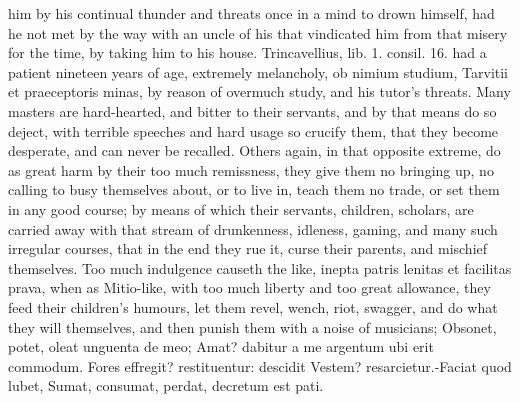{him by his continual thunder and threats once in a mind to drown
himself, had he not met by the way with an uncle of his that vindicated
him from that misery for the time, by taking him to his house.
Trincavellius, lib. 1. consil. 16. had a patient nineteen years of age,
extremely melancholy, ob nimium studium, Tarvitii et praeceptoris
minas, by reason of overmuch study, and his tutor's threats. Many
masters are hard-hearted, and bitter to their servants, and by that
means do so deject, with terrible speeches and hard usage so crucify
them, that they become desperate, and can never be recalled.
Others again, in that opposite extreme, do as great harm by their too
much remissness, they give them no bringing up, no calling to busy
themselves about, or to live in, teach them no trade, or set them in
any good course; by means of which their servants, children, scholars,
are carried away with that stream of drunkenness, idleness, gaming, and
many such irregular courses, that in the end they rue it, curse their
parents, and mischief themselves. Too much indulgence causeth the like,
inepta patris lenitas et facilitas prava, when as Mitio-like,
with too much liberty and too great allowance, they feed their
children's humours, let them revel, wench, riot, swagger, and do what
they will themselves, and then punish them with a noise of musicians;
Obsonet, potet, oleat unguenta de meo;
Amat? dabitur a me argentum ubi erit commodum.
Fores effregit? restituentur: descidit
Vestem? resarcietur.-Faciat quod lubet,
Sumat, consumat, perdat, decretum est pati.

}
